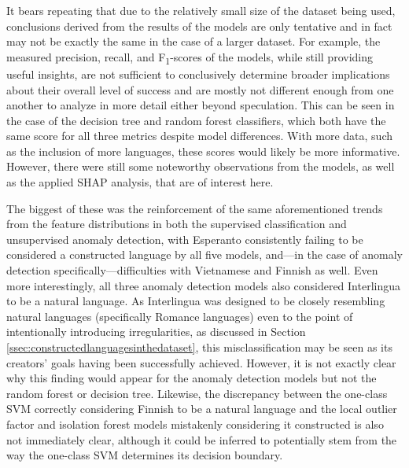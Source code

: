 \documentclass[12pt,a4paper]{article}
\numberwithin{figure}{section}
\numberwithin{table}{section}
\numberwithin{definition}{section}
\begin{document}
It bears repeating that due to the relatively small size of the dataset being used, conclusions derived from the results of the models are only tentative and in fact may not be exactly the same in the case of a larger dataset. For example, the measured precision, recall, and F\textsubscript{1}-scores of the models, while still providing useful insights, are not sufficient to conclusively determine broader implications about their overall level of success and are mostly not different enough from one another to analyze in more detail either beyond speculation. This can be seen in the case of the decision tree and random forest classifiers, which both have the same score for all three metrics despite model differences. With more data, such as the inclusion of more languages, these scores would likely be more informative. However, there were still some noteworthy observations from the models, as well as the applied SHAP analysis, that are of interest here.

The biggest of these was the reinforcement of the same aforementioned trends from the feature distributions in both the supervised classification and unsupervised anomaly detection, with Esperanto consistently failing to be considered a constructed language by all five models, and---in the case of anomaly detection specifically---difficulties with Vietnamese and Finnish as well. Even more interestingly, all three anomaly detection models also considered Interlingua to be a natural language. As Interlingua was designed to be closely resembling natural languages (specifically Romance languages) even to the point of intentionally introducing irregularities, as discussed in Section \ref{ssec:constructedlanguagesinthedataset}, this misclassification may be seen as its creators' goals having been successfully achieved. However, it is not exactly clear why this finding would appear for the anomaly detection models but not the random forest or decision tree. Likewise, the discrepancy between the one-class SVM correctly considering Finnish to be a natural language and the local outlier factor and isolation forest models mistakenly considering it constructed is also not immediately clear, although it could be inferred to potentially stem from the way the one-class SVM determines its decision boundary. %
\end{document}
